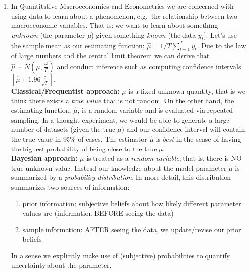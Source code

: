 \begin{enumerate}
\item In Quantitative Macroeconomics and Econometrics we are concerned with using data to learn about a phenomenon,
  e.g.\ the relationship between two macroeconomic variables.
That is: we want to learn about something \emph{unknown} (the parameter \(\mu \)) given something \emph{known} (the data \(y_t\)).
Let's use the sample mean as our estimating function:
\(\hat{\mu}=1/T \sum_{t=1}^T y_t\).
Due to the law of large numbers and the central limit theorem we can derive that
\(\hat{\mu}\sim N(\mu,\frac{\sigma^2}{T})\)
and conduct inference such as computing confidence intervals \([\hat{\mu}\pm 1.96 \frac{\sigma}{\sqrt{T}}]\).
\\
\textbf{Classical/Frequentist approach:} \(\mu \) is a fixed unknown quantity, that is we think there exists a \emph{true value} that is not random.
On the other hand, the estimating function, \(\hat{\mu}\), is a random variable and is evaluated via repeated sampling.
In a thought experiment, we would be able to generate a large number of datasets (given the true \(\mu \))
  and our confidence interval will contain the true value in 95\% of cases.
The estimator \(\hat{\mu}\) is \emph{best} in the sense of having the highest probability of being close to the true \(\mu \).
\\
\textbf{Bayesian approach:} \(\mu \) is treated as a \emph{random variable}; that is, there is NO true unknown value.
Instead our knowledge about the model parameter \(\mu \) is summarized by a \emph{probability distribution}.
In more detail, this distribution summarizes two sources of information:
\begin{enumerate}
\item prior information: subjective beliefs about how likely different parameter values are (information BEFORE seeing the data)
\item sample information: AFTER seeing the data, we update/revise our prior beliefs
\end{enumerate}
In a sense we explicitly make use of (subjective) probabilities to quantify uncertainty about the parameter.


\end{enumerate}
